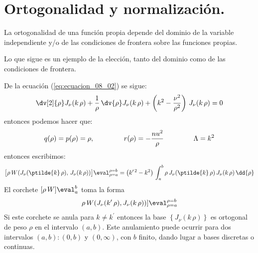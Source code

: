 \section{Ortogonalidad y normalización.}
La ortogonalidad de una función propia depende del dominio de la variable independiente y/o de las condiciones de frontera sobre las funciones propias.
\par
Lo que sigue es un ejemplo de la elección, tanto del dominio como de las condiciones de frontera.
\par
De la ecuación (\ref{eq:ecuacion_08_02}) se sigue:
\begin{align*}
\dv[2]{\rho} J_{\nu} (k \, \rho) + \dfrac{1}{\rho} \, \dv{\rho} J_{\nu} (k \, \rho) + \left( k^{2} - \dfrac{\nu^{2}}{\rho^{2}} \right) \, J_{\nu} (k \, \rho) = 0
\end{align*}
entonces podemos hacer que:
\begin{align*}
q(\rho) = p(\rho) = \rho, \hspace{1.5cm} r(\rho) = -\dfrac{nu^{2}}{\rho} \hspace{1.5cm} \Lambda = k^{2}
\end{align*}
entonces escribimos:
\begin{align}
\big[ \rho \, W(J_{\nu}(\ptilde{k} \, \rho), \, J_{\nu} (k \, \rho)) \big]\eval_{\rho=a}^{\rho=b} = \big( k^{\prime \, 2} - k^{2} \big) \, \int_{a}^{b} \rho \, J_{\nu}(\ptilde{k} \, \rho) \, J_{\nu} (k \, \rho) \, \dd{\rho}
\label{eq:ecuacion_08_12}
\end{align}
El corchete $[\rho \, W]\eval_{a}^{b}$ toma la forma
\begin{align*}
\rho \, W(J_{\nu}(k^{\prime} \, \rho), J_{\nu} (k \, \rho))]\eval_{\rho=a}^{\rho=b}
\end{align*}
Si este corchete se anula para $k \neq k^{\prime}$ entonces la base $\left\{ J_{\nu} (k \, \rho) \right\}$ es ortogonal de peso $\rho$ en el intervalo $(a,b)$. Este anulamiento puede ocurrir para dos intervalos $(a,b): (0, b)$ y $(0, \infty)$, con $b$ finito, dando lugar a bases discretas o continuas.
